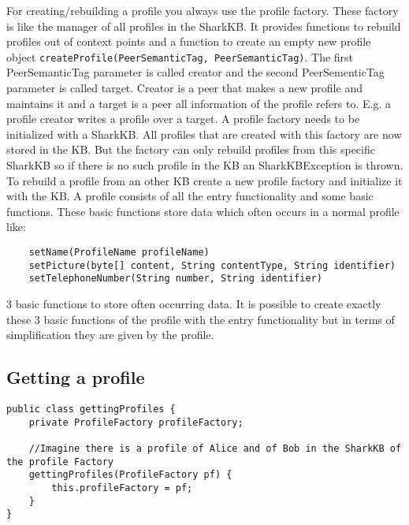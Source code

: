 For creating/rebuilding a profile you always use the profile factory. These factory is like the manager of all profiles in the SharkKB. It provides functions to rebuild profiles out of context points and a function to create an empty new profile object {\tt createProfile(PeerSemanticTag, PeerSemanticTag)}. The first PeerSemanticTag parameter is called creator and the second PeerSementicTag parameter is called target. Creator is a peer that makes a new profile and maintains it and a target is a peer all information of the profile refers to. E.g. a profile creator writes a profile over a target. A profile factory needs to be initialized with a SharkKB. All profiles that are created with this factory are now stored in the KB. But the factory can only rebuild profiles from this specific SharkKB so if there is no such profile in the KB an SharkKBException is thrown. To rebuild a profile from an other KB create a new profile factory and initialize it with the KB. A profile consists of all the entry functionality and some basic functions. These basic functions store data which often occurs in a normal profile like:
\begin{verbatim}
	setName(ProfileName profileName) 
	setPicture(byte[] content, String contentType, String identifier)
	setTelephoneNumber(String number, String identifier)
\end{verbatim}
3 basic functions to store often occurring data. It is possible to create exactly these 3 basic functions of the profile with the entry functionality but in terms of simplification they are given by the profile.

\subsection{Getting a profile}
\begin{verbatim}
public class gettingProfiles {
    private ProfileFactory profileFactory;
    
    //Imagine there is a profile of Alice and of Bob in the SharkKB of the profile Factory
    gettingProfiles(ProfileFactory pf) {
    	this.profileFactory = pf;
    }
}
\end{verbatim}